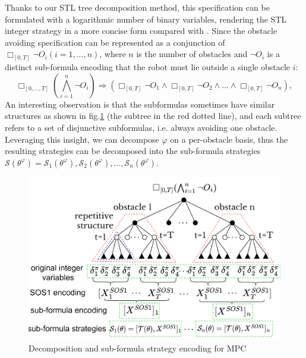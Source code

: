 \documentclass[a4paper]{report}
\begin{document}
Thanks to our STL tree decomposition method, this specification can be formulated with a logarithmic number of binary variables, rendering the STL integer strategy in a more concise form compared with \cite{bertsimas2022online}\cite{Cauligi2020}. Since the obstacle avoiding specification can be represented as a conjunction of $\Box_{[0,T]}\lnot O_i(i=1,...,n)$, where $n$ is the number of obstacles and $\lnot O_i$ is a distinct sub-formula encoding that the robot must lie outside a single obstacle $i$:
\begin{equation}
    \Box_{[0,...,T]}(\bigwedge_{i=1}^n\lnot O_i) \Rightarrow (\Box_{[0,T]}\lnot O_1 \wedge \Box_{[0,T]}\lnot O_2\wedge...\wedge \Box_{[0,T]}\lnot O_n),
\end{equation}
An interesting observation is that the subformulas sometimes have similar structures as shown in fig.\ref{mpc_tree} (the subtree in the red dotted line), and each subtree refers to a set of disjunctive subformulas, i.e. always avoiding one obstacle. Leveraging this insight, we can decompose $\varphi$ on a per-obstacle basis, thus the resulting strategies can be decomposed into the sub-formula strategies $\mathcal{S}(\theta^\varphi) = \mathcal{S}_1(\theta^\varphi), \mathcal{S}_2(\theta^\varphi),...,\mathcal{S}_n(\theta^\varphi)$. 

\begin{figure}
    \vspace{0.5cm}
    \centering
    \includegraphics[scale=0.7]{mpc_tree.png}
    \vspace{-0.4cm}
    \caption{Decomposition and sub-formula strategy encoding for MPC }
    \label{mpc_tree}
    \vspace{-0.5cm}
    \end{figure}
\end{document}
